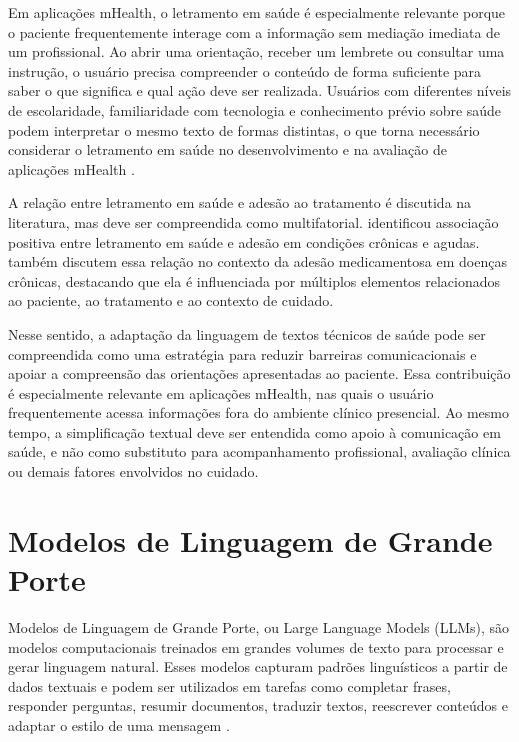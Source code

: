 Em aplicações mHealth, o letramento em saúde é especialmente relevante porque o paciente frequentemente interage com a informação sem mediação imediata de um profissional. Ao abrir uma orientação, receber um lembrete ou consultar uma instrução, o usuário precisa compreender o conteúdo de forma suficiente para saber o que significa e qual ação deve ser realizada. Usuários com diferentes níveis de escolaridade, familiaridade com tecnologia e conhecimento prévio sobre saúde podem interpretar o mesmo texto de formas distintas, o que torna necessário considerar o letramento em saúde no desenvolvimento e na avaliação de aplicações mHealth \cite{emerson2022mhealth}.

A relação entre letramento em saúde e adesão ao tratamento é discutida na literatura, mas deve ser compreendida como multifatorial.  identificou associação positiva entre letramento em saúde e adesão em condições crônicas e agudas.  também discutem essa relação no contexto da adesão medicamentosa em doenças crônicas, destacando que ela é influenciada por múltiplos elementos relacionados ao paciente, ao tratamento e ao contexto de cuidado.

Nesse sentido, a adaptação da linguagem de textos técnicos de saúde pode ser compreendida como uma estratégia para reduzir barreiras comunicacionais e apoiar a compreensão das orientações apresentadas ao paciente. Essa contribuição é especialmente relevante em aplicações mHealth, nas quais o usuário frequentemente acessa informações fora do ambiente clínico presencial. Ao mesmo tempo, a simplificação textual deve ser entendida como apoio à comunicação em saúde, e não como substituto para acompanhamento profissional, avaliação clínica ou demais fatores envolvidos no cuidado.

\section{Modelos de Linguagem de Grande Porte}
\label{sec:modelos-linguagem-grande-porte}

Modelos de Linguagem de Grande Porte, ou Large Language Models (LLMs), são modelos computacionais treinados em grandes volumes de texto para processar e gerar linguagem natural. Esses modelos capturam padrões linguísticos a partir de dados textuais e podem ser utilizados em tarefas como completar frases, responder perguntas, resumir documentos, traduzir textos, reescrever conteúdos e adaptar o estilo de uma mensagem \cite{zhao2023survey,naveed2023overview}.

